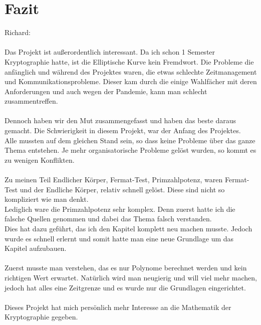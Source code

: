 \chapter{Fazit}

Richard:\\
\\
Das Projekt ist außerordentlich interessant. Da ich schon 1 Semester Kryptographie hatte, 
ist die Elliptische Kurve kein Fremdwort. Die Probleme die anfänglich und während des Projektes waren, die etwas schlechte Zeitmanagement und Kommunikationsprobleme.
Dieser kam durch die einige Wahlfächer mit deren Anforderungen und auch wegen der Pandemie, kann man schlecht zusammentreffen.\\
\\
Dennoch haben wir den Mut zusammengefasst und haben das beste daraus gemacht. Die Schwierigkeit in diesem Projekt, war der Anfang des Projektes.
\\
Alle mussten auf dem gleichen Stand sein, so dass keine Probleme über das ganze Thema entstehen.
Je mehr organisatorische Probleme gelöst wurden, so kommt es zu wenigen Konflikten.
\\
\\
Zu meinen Teil Endlicher Körper, Fermat-Test, Primzahlpotenz, waren Fermat-Test und der Endliche Körper, relativ schnell gelöst.
Diese sind nicht so kompliziert wie man denkt.\\
Lediglich ware die Primzahlpotenz sehr komplex. Denn zuerst hatte ich die falsche Quellen genommen und dabei das Thema falsch verstanden.\\
Dies hat dazu geführt, das ich den Kapitel komplett neu machen musste. Jedoch wurde es schnell erlernt und somit hatte man eine neue Grundlage um das Kapitel aufzubauen.\\
\\
Zuerst musste man verstehen, das es nur Polynome berechnet werden und kein richtigen Wert erwartet. 
Natürlich wird man neugierig und will viel mehr machen, jedoch hat alles eine Zeitgrenze und es wurde nur die Grundlagen eingerichtet.\\
\\
Dieses Projekt hat mich persönlich mehr Interesse an die Mathematik der Kryptographie gegeben. 

